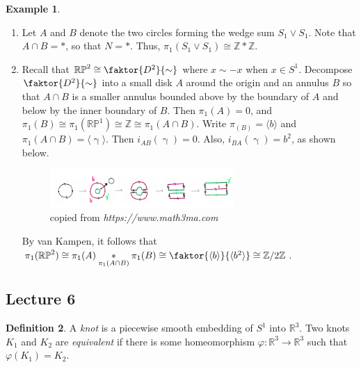 \documentclass[10pt,letterpaper,cm]{nupset}
\theoremstyle{definition}
\newtheorem{definition}{Definition}[subsection]
\newtheorem{exmp}[definition]{Example}
\theoremstyle{theorem}
\theoremstyle{remark}
\newcommand{\R}{\mathbb{R}}
\newcommand{\RP}{\mathbb{RP}}
\newcommand{\Z}{\mathbb Z}
\newcommand{\1}{\mathbb{1}}
\newcommand{\0}{\vec 0}
\begin{document}
\begin{exmp} $ $
\begin{enumerate}
\item  Let $A$ and $B$ denote the two circles forming the wedge sum $S_1 \vee S_1$.  Note that $A\cap B = \ast$, so that $N=\ast$. Thus, $\pi_1(S_1 \vee S_1) \cong \Z \ast \Z$.
\item Recall that $\RP^2 \cong \faktor{D^2}{\sim}$ where $x\sim -x$ when $x\in S^1$. Decompose $\faktor{D^2}{\sim}$ into a small disk $A$ around the origin and an annulus $B$ so that $A \cap B$ is a smaller annulus bounded above by the boundary of $A$ and below by the inner boundary of $B$. Then $\pi_1(A) =0$, and $\pi_1(B) \cong \pi_1(\RP^1) \cong  \Z \cong \pi_1(A \cap B)$. Write $\pi_(B) = \langle b \rangle$ and $\pi_1(A \cap B) = \langle \upgamma \rangle$. Then $i_{AB}(\upgamma) =0$. Also, $i_{BA}(\upgamma) = b^2$, as shown below.
\begin{figure}[H]
\centering
\includegraphics[width=70mm]{math3ma-RP2.png}
\caption{copied from \textit{https://www.math3ma.com}} \label{overflow}
\end{figure}
By van Kampen, it follows that $\pi_1(\RP^2) \cong \pi_1(A) \underset{\pi_1(A \cap B)}{\ast} \pi_1(B) \cong \faktor{\langle b \rangle}{\langle b^2 \rangle} \cong \Z / 2 \Z$.
\end{enumerate}
\end{exmp}

\subsection{Lecture 6}

\begin{definition}
A \textit{knot} is a piecewise smooth embedding of $S^1$ into $\R^3$. Two knots $K_1$ and $K_2$ are \textit{equivalent} if there is some homeomorphism $\varphi : \R^3 \to \R^3$ such that $\varphi(K_1) = K_2$.
\end{definition}
\end{document}
